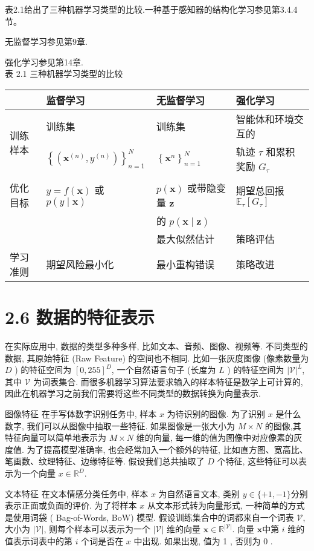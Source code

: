 \documentclass[10pt]{article}
\begin{document}
表2.1给出了三种机器学习类型的比较.一种基于感知器的结构化学习参见第3.4.4节。

无监督学习参见第9章.

强化学习参见第14章.\\
表 2.1 三种机器学习类型的比较

\begin{center}
\begin{tabular}{llll}
\hline
 & 监督学习 & 无监督学习 & 强化学习 \\
\hline
\multirow{2}{*}{训练样本} & 训练集 & 训练集 & 智能体和环境交互的 \\
 & $\left\{\left(\boldsymbol{x}^{(n)}, y^{(n)}\right)\right\}_{n=1}^{N}$ & $\left\{\boldsymbol{x}^{n}\right\}_{n=1}^{N}$ & 轨迹 $\tau$ 和累积奖励 $G_{\tau}$ \\
 &  &  &  \\
优化目标 & $y=f(\boldsymbol{x})$ 或 $p(y \mid \boldsymbol{x})$ & $p(\boldsymbol{x})$ 或带隐变量 $\boldsymbol{z}$ & 期望总回报 $\mathbb{E}_{\tau}\left[G_{\tau}\right]$ \\
 &  & 的 $p(\boldsymbol{x} \mid \boldsymbol{z})$ &  \\
 &  & 最大似然估计 & 策略评估 \\
学习准则 & 期望风险最小化 & 最小重构错误 & 策略改进 \\
\hline
\end{tabular}
\end{center}

\section*{2.6 数据的特征表示}
在实际应用中, 数据的类型多种多样, 比如文本、音频、图像、视频等. 不同类型的数据, 其原始特征 (Raw Feature) 的空间也不相同. 比如一张灰度图像 (像素数量为 $D$ ) 的特征空间为 $[0,255]^{D}$, 一个自然语言句子 (长度为 $L$ ) 的特征空间为 $|\mathcal{V}|^{L}$, 其中 $\mathcal{V}$ 为词表集合. 而很多机器学习算法要求输入的样本特征是数学上可计算的, 因此在机器学习之前我们需要将这些不同类型的数据转换为向量表示.

图像特征 在手写体数字识别任务中, 样本 $x$ 为待识别的图像. 为了识别 $x$ 是什么数字, 我们可以从图像中抽取一些特征. 如果图像是一张大小为 $M \times N$ 的图像,其特征向量可以简单地表示为 $M \times N$ 维的向量, 每一维的值为图像中对应像素的灰度值. 为了提高模型准确率, 也会经常加入一个额外的特征, 比如直方图、宽高比、笔画数、纹理特征、边缘特征等. 假设我们总共抽取了 $D$ 个特征, 这些特征可以表示为一个向量 $x \in \mathbb{R}^{D}$.

文本特征 在文本情感分类任务中, 样本 $x$ 为自然语言文本, 类别 $y \in\{+1,-1\}$分别表示正面或负面的评价. 为了将样本 $x$ 从文本形式转为向量形式, 一种简单的方式是使用词袋 ( Bag-of-Words, BoW) 模型. 假设训练集合中的词都来自一个词表 $\mathcal{V}$, 大小为 $|\mathcal{V}|$, 则每个样本可以表示为一个 $|\mathcal{V}|$ 维的向量 $\boldsymbol{x} \in \mathbb{R}^{|\mathcal{V}|}$. 向量 $\boldsymbol{x}$中第 $i$ 维的值表示词表中的第 $i$ 个词是否在 $x$ 中出现. 如果出现, 值为 1 , 否则为 0 .
\end{document}
